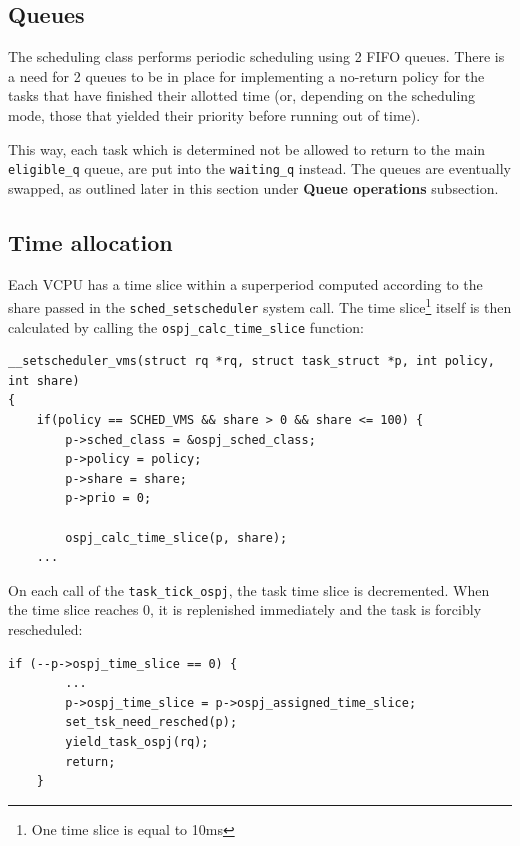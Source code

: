 \documentclass[]{report}
\begin{document}
\subsection{Queues}\label{queues}

The scheduling class performs periodic scheduling using 2 FIFO queues.
There is a need for 2 queues to be in place for implementing a no-return
policy for the tasks that have finished their allotted time (or,
depending on the scheduling mode, those that yielded their priority
before running out of time).

This way, each task which is determined not be allowed to return to the
main \lstinline!eligible_q! queue, are put into the
\lstinline!waiting_q! instead. The queues are eventually swapped, as
outlined later in this section under \textbf{Queue operations}
subsection.

\subsection{Time allocation}\label{time-allocation}

Each VCPU has a time slice within a superperiod computed according to
the share passed in the \lstinline!sched_setscheduler! system call. The
time slice\footnote{One time slice is equal to 10ms} itself is then
calculated by calling the \lstinline!ospj_calc_time_slice! function:

\begin{lstlisting}[style=c, firstnumber=3890, caption=core.c]
__setscheduler_vms(struct rq *rq, struct task_struct *p, int policy, int share)
{
    if(policy == SCHED_VMS && share > 0 && share <= 100) {
        p->sched_class = &ospj_sched_class;
        p->policy = policy;
        p->share = share;
        p->prio = 0;

        ospj_calc_time_slice(p, share);
    ...
\end{lstlisting}

On each call of the \lstinline!task_tick_ospj!, the task time slice is
decremented. When the time slice reaches 0, it is replenished
immediately and the task is forcibly rescheduled:

\begin{lstlisting}[style=c, firstnumber=357, caption=ospj.c]
if (--p->ospj_time_slice == 0) {
        ...
        p->ospj_time_slice = p->ospj_assigned_time_slice;
        set_tsk_need_resched(p);
        yield_task_ospj(rq);
        return;
    }
\end{lstlisting}
\end{document}

